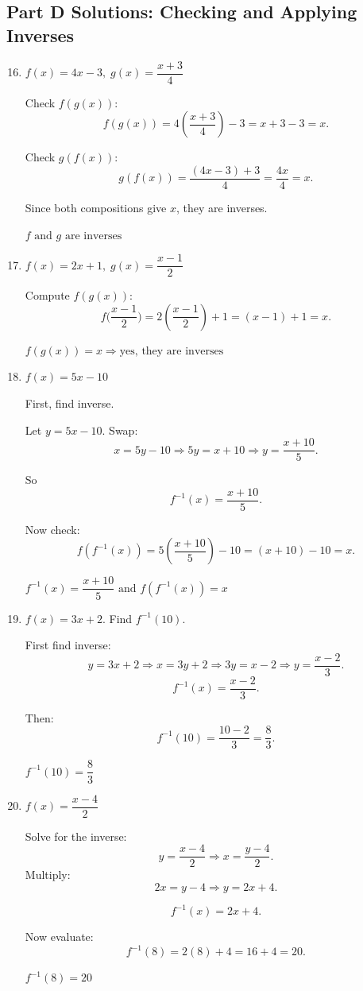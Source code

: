 \documentclass[14pt]{extarticle}
\begin{document}
\subsection*{Part D Solutions: Checking and Applying Inverses}
\begin{enumerate}
  \setcounter{enumi}{15}
  \item \(f(x) = 4x - 3,\; g(x) = \dfrac{x + 3}{4}\)

  Check \(f(g(x))\):
  \[
  f(g(x)) = 4\left(\frac{x + 3}{4}\right) - 3 = x + 3 - 3 = x.
  \]

  Check \(g(f(x))\):
  \[
  g(f(x)) = \frac{(4x - 3) + 3}{4} = \frac{4x}{4} = x.
  \]

  Since both compositions give \(x\), they are inverses.

  \(\boxed{f \text{ and } g \text{ are inverses}}\)

  \item \(f(x) = 2x + 1,\; g(x) = \dfrac{x - 1}{2}\)

  Compute \(f(g(x))\):
  \[
  f\bigg(\frac{x - 1}{2}\bigg) = 2\left(\frac{x - 1}{2}\right) + 1 = (x - 1) + 1 = x.
  \]

  \(\boxed{f(g(x)) = x \Rightarrow \text{yes, they are inverses}}\)

  \item \(f(x) = 5x - 10\)

  First, find inverse.

  Let \(y = 5x - 10.\) Swap:
  \[
  x = 5y - 10 \Rightarrow 5y = x + 10 \Rightarrow y = \frac{x + 10}{5}.
  \]

  So
  \[
  f^{-1}(x) = \frac{x + 10}{5}.
  \]

  Now check:
  \[
  f(f^{-1}(x)) = 5\left(\frac{x + 10}{5}\right) - 10 = (x + 10) - 10 = x.
  \]

  \(\boxed{f^{-1}(x) = \dfrac{x + 10}{5} \text{ and } f(f^{-1}(x)) = x}\)

  \item \(f(x) = 3x + 2.\) Find \(f^{-1}(10)\).

  First find inverse:
  \[
  y = 3x + 2 \Rightarrow x = 3y + 2 \Rightarrow 3y = x - 2 \Rightarrow y = \frac{x - 2}{3}.
  \]
  \[
  f^{-1}(x) = \frac{x - 2}{3}.
  \]

  Then:
  \[
  f^{-1}(10) = \frac{10 - 2}{3} = \frac{8}{3}.
  \]

  \(\boxed{f^{-1}(10) = \dfrac{8}{3}}\)

  \item \(f(x) = \dfrac{x - 4}{2}\)

  Solve for the inverse:
  \[
  y = \frac{x - 4}{2} \Rightarrow x = \frac{y - 4}{2}.
  \]
  Multiply:
  \[
  2x = y - 4 \Rightarrow y = 2x + 4.
  \]

  \[
  f^{-1}(x) = 2x + 4.
  \]

  Now evaluate:
  \[
  f^{-1}(8) = 2(8) + 4 = 16 + 4 = 20.
  \]

  \(\boxed{f^{-1}(8) = 20}\)
\end{enumerate}
\end{document}
